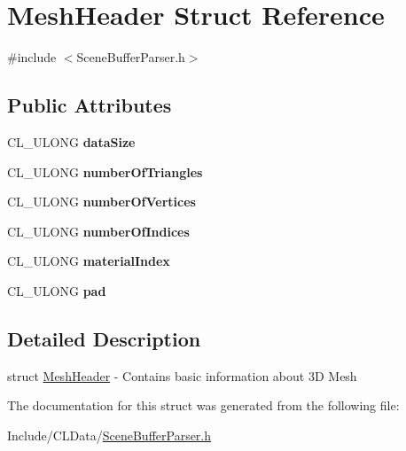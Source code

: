 \hypertarget{struct_mesh_header}{}\section{Mesh\+Header Struct Reference}
\label{struct_mesh_header}


{\ttfamily \#include $<$Scene\+Buffer\+Parser.\+h$>$}

\subsection*{Public Attributes}
\begin{DoxyCompactItemize}
\item 
C\+L\+\_\+\+U\+L\+O\+NG {\bfseries data\+Size}\hypertarget{struct_mesh_header_a9ec0e9dba13790f028793c2b33aba487}{}\label{struct_mesh_header_a9ec0e9dba13790f028793c2b33aba487}

\item 
C\+L\+\_\+\+U\+L\+O\+NG {\bfseries number\+Of\+Triangles}\hypertarget{struct_mesh_header_a339e9543de6e033ff66b612ce1e8d308}{}\label{struct_mesh_header_a339e9543de6e033ff66b612ce1e8d308}

\item 
C\+L\+\_\+\+U\+L\+O\+NG {\bfseries number\+Of\+Vertices}\hypertarget{struct_mesh_header_a2fb7f49356512709de01811b39a35077}{}\label{struct_mesh_header_a2fb7f49356512709de01811b39a35077}

\item 
C\+L\+\_\+\+U\+L\+O\+NG {\bfseries number\+Of\+Indices}\hypertarget{struct_mesh_header_a9f6369c33910455e60ad7b931d92c197}{}\label{struct_mesh_header_a9f6369c33910455e60ad7b931d92c197}

\item 
C\+L\+\_\+\+U\+L\+O\+NG {\bfseries material\+Index}\hypertarget{struct_mesh_header_a375a65107f5c72cb8d82c1cd94ce4780}{}\label{struct_mesh_header_a375a65107f5c72cb8d82c1cd94ce4780}

\item 
C\+L\+\_\+\+U\+L\+O\+NG {\bfseries pad}\hypertarget{struct_mesh_header_a9a13116095a64b501761941224f48ede}{}\label{struct_mesh_header_a9a13116095a64b501761941224f48ede}

\end{DoxyCompactItemize}


\subsection{Detailed Description}
struct \hyperlink{struct_mesh_header}{Mesh\+Header} -\/ Contains basic information about 3D Mesh 

The documentation for this struct was generated from the following file\+:\begin{DoxyCompactItemize}
\item 
Include/\+C\+L\+Data/\hyperlink{_scene_buffer_parser_8h}{Scene\+Buffer\+Parser.\+h}\end{DoxyCompactItemize}
